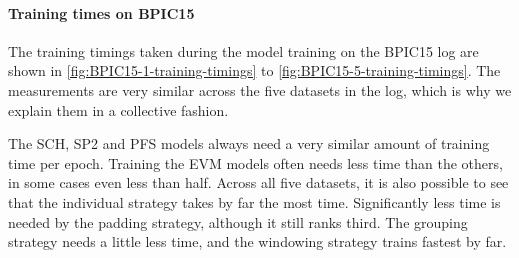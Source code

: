 \paragraph{Training times on BPIC15}
The training timings taken during the model training on the BPIC15 log are shown in \autoref{fig:BPIC15-1-training-timings} to \autoref{fig:BPIC15-5-training-timings}.
The measurements are very similar across the five datasets in the log, which is why we explain them in a collective fashion.

The SCH, SP2 and PFS models always need a very similar amount of training time per epoch.
Training the EVM models often needs less time than the others, in some cases even less than half.
Across all five datasets, it is also possible to see that the individual strategy takes by far the most time.
Significantly less time is needed by the padding strategy, although it still ranks third.
The grouping strategy needs a little less time, and the windowing strategy trains fastest by far.

